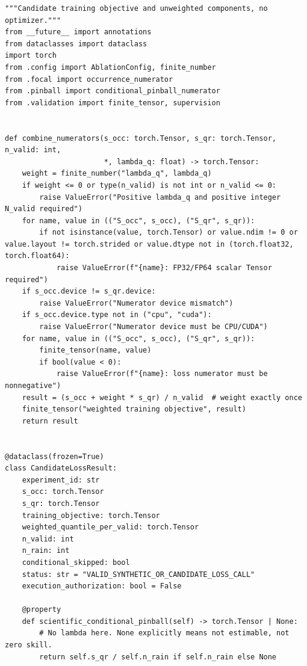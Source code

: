 \documentclass[UTF8,fontset=fandol,10pt]{ctexart}
\begin{document}
\begin{lstlisting}
"""Candidate training objective and unweighted components, no optimizer."""
from __future__ import annotations
from dataclasses import dataclass
import torch
from .config import AblationConfig, finite_number
from .focal import occurrence_numerator
from .pinball import conditional_pinball_numerator
from .validation import finite_tensor, supervision


def combine_numerators(s_occ: torch.Tensor, s_qr: torch.Tensor, n_valid: int,
                       *, lambda_q: float) -> torch.Tensor:
    weight = finite_number("lambda_q", lambda_q)
    if weight <= 0 or type(n_valid) is not int or n_valid <= 0:
        raise ValueError("Positive lambda_q and positive integer N_valid required")
    for name, value in (("S_occ", s_occ), ("S_qr", s_qr)):
        if not isinstance(value, torch.Tensor) or value.ndim != 0 or value.layout != torch.strided or value.dtype not in (torch.float32, torch.float64):
            raise ValueError(f"{name}: FP32/FP64 scalar Tensor required")
    if s_occ.device != s_qr.device:
        raise ValueError("Numerator device mismatch")
    if s_occ.device.type not in ("cpu", "cuda"):
        raise ValueError("Numerator device must be CPU/CUDA")
    for name, value in (("S_occ", s_occ), ("S_qr", s_qr)):
        finite_tensor(name, value)
        if bool(value < 0):
            raise ValueError(f"{name}: loss numerator must be nonnegative")
    result = (s_occ + weight * s_qr) / n_valid  # weight exactly once
    finite_tensor("weighted training objective", result)
    return result


@dataclass(frozen=True)
class CandidateLossResult:
    experiment_id: str
    s_occ: torch.Tensor
    s_qr: torch.Tensor
    training_objective: torch.Tensor
    weighted_quantile_per_valid: torch.Tensor
    n_valid: int
    n_rain: int
    conditional_skipped: bool
    status: str = "VALID_SYNTHETIC_OR_CANDIDATE_LOSS_CALL"
    execution_authorization: bool = False

    @property
    def scientific_conditional_pinball(self) -> torch.Tensor | None:
        # No lambda here. None explicitly means not estimable, not zero skill.
        return self.s_qr / self.n_rain if self.n_rain else None



\end{lstlisting}
\end{document}
